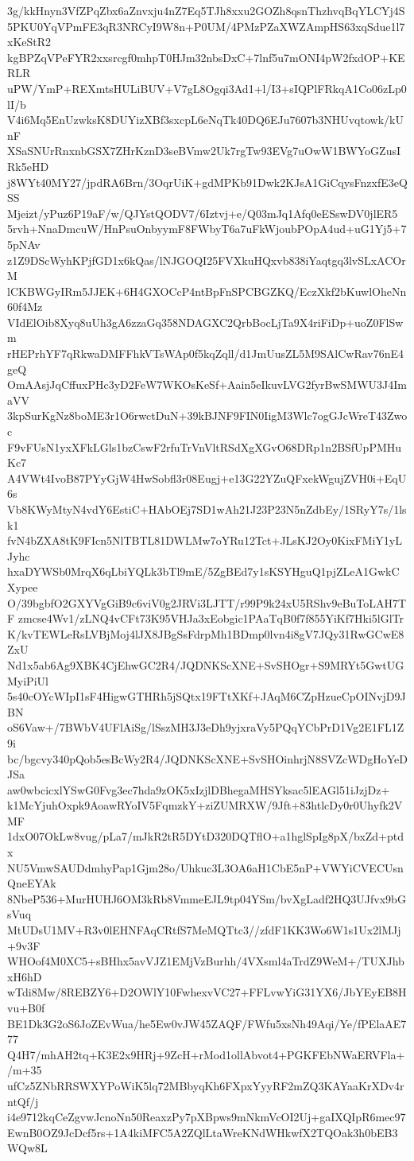 3g/kkHnyn3VfZPqZbx6aZnvxju4nZ7Eq5TJh8xxu2GOZh8qsnThzhvqBqYLCYj4S
5PKU0YqVPmFE3qR3NRCyI9W8n+P0UM/4PMzPZaXWZAmpHS63xqSdue1l7xKeStR2
kgBPZqVPeFYR2xxsrcgf0mhpT0HJm32nbsDxC+7lnf5u7mONI4pW2fxdOP+KERLR
uPW/YmP+REXmtsHULiBUV+V7gL8Ogqi3Ad1+l/I3+sIQPlFRkqA1Co06zLp0lI/b
V4i6Mq5EnUzwksK8DUYizXBf3sxcpL6eNqTk40DQ6EJu7607b3NHUvqtowk/kUnF
XSaSNUrRnxnbGSX7ZHrKznD3seBVmw2Uk7rgTw93EVg7uOwW1BWYoGZusIRk5eHD
j8WYt40MY27/jpdRA6Brn/3OqrUiK+gdMPKb91Dwk2KJsA1GiCqysFnzxfE3eQSS
Mjeizt/yPuz6P19aF/w/QJYstQODV7/6Iztvj+e/Q03mJq1Afq0eESswDV0jlER5
5rvh+NnaDmcuW/HnPsuOnbyymF8FWbyT6a7uFkWjoubPOpA4ud+uG1Yj5+75pNAv
z1Z9DScWyhKPjfGD1x6kQas/lNJGOQI25FVXkuHQxvb838iYaqtgq3lvSLxACOrM
lCKBWGyIRm5JJEK+6H4GXOCcP4ntBpFnSPCBGZKQ/EczXkf2bKuwlOheNn60f4Mz
VIdElOib8Xyq8uUh3gA6zzaGq358NDAGXC2QrbBocLjTa9X4riFiDp+uoZ0FlSwm
rHEPrhYF7qRkwaDMFFhkVTsWAp0f5kqZqll/d1JmUusZL5M9SAlCwRav76nE4geQ
OmAAsjJqCffuxPHc3yD2FeW7WKOsKeSf+Aain5eIkuvLVG2fyrBwSMWU3J4ImaVV
3kpSurKgNz8boME3r1O6rwctDuN+39kBJNF9FIN0IigM3Wlc7ogGJcWreT43Zwoc
F9vFUsN1yxXFkLGls1bzCswF2rfuTrVnVltRSdXgXGvO68DRp1n2BSfUpPMHuKc7
A4VWt4IvoB87PYyGjW4HwSobfl3r08Eugj+e13G22YZuQFxekWgujZVH0i+EqU6s
Vb8KWyMtyN4vdY6EstiC+HAbOEj7SD1wAh21J23P23N5nZdbEy/1SRyY7s/1lsk1
fvN4bZXA8tK9FIcn5NlTBTL81DWLMw7oYRu12Tct+JLsKJ2Oy0KixFMiY1yLJyhc
hxaDYWSb0MrqX6qLbiYQLk3bTl9mE/5ZgBEd7y1sKSYHguQ1pjZLeA1GwkCXypee
O/39bgbfO2GXYVgGiB9c6viV0g2JRVi3LJTT/r99P9k24xU5RShv9eBuToLAH7TF
zmcse4Wv1/zLNQ4vCFt73K95VHJa3xEobgic1PAaTqB0f7f855YiKf7Hki5lGlTr
K/kvTEWLeRsLVBjMoj4lJX8JBgSsFdrpMh1BDmp0lvn4i8gV7JQy31RwGCwE8ZxU
Nd1x5ab6Ag9XBK4CjEhwGC2R4/JQDNKScXNE+SvSHOgr+S9MRYt5GwtUGMyiPiUl
5s40cOYcWIpI1sF4HigwGTHRh5jSQtx19FTtXKf+JAqM6CZpHzueCpOINvjD9JBN
oS6Vaw+/7BWbV4UFlAiSg/lSszMH3J3eDh9yjxraVy5PQqYCbPrD1Vg2E1FL1Z9i
bc/bgcvy340pQob5esBcWy2R4/JQDNKScXNE+SvSHOinhrjN8SVZcWDgHoYeDJSa
aw0wbcicxlYSwG0Fvg3ec7hda9zOK5xIzjlDBhegaMHSYksac5lEAGl51iJzjDz+
k1McYjuhOxpk9AoawRYoIV5FqmzkY+ziZUMRXW/9Jft+83htlcDy0r0Uhyfk2VMF
1dxO07OkLw8vug/pLa7/mJkR2tR5DYtD320DQTflO+a1hglSpIg8pX/bxZd+ptdx
NU5VmwSAUDdmhyPap1Gjm28o/Uhkuc3L3OA6aH1CbE5nP+VWYiCVECUsnQneEYAk
8NbeP536+MurHUHJ6OM3kRb8VmmeEJL9tp04YSm/bvXgLadf2HQ3UJfvx9bGsVuq
MtUDsU1MV+R3v0lEHNFAqCRtfS7MeMQTtc3//zfdF1KK3Wo6W1s1Ux2lMJj+9v3F
WHOof4M0XC5+sBHhx5avVJZ1EMjVzBurhh/4VXsml4aTrdZ9WeM+/TUXJhbxH6hD
wTdi8Mw/8REBZY6+D2OWlY10FwhexvVC27+FFLvwYiG31YX6/JbYEyEB8Hvu+B0f
BE1Dk3G2oS6JoZEvWua/he5Ew0vJW45ZAQF/FWfu5xsNh49Aqi/Ye/fPElaAE777
Q4H7/mhAH2tq+K3E2x9HRj+9ZcH+rMod1ollAbvot4+PGKFEbNWaERVFla+/m+35
ufCz5ZNbRRSWXYPoWiK5lq72MBbyqKh6FXpxYyyRF2mZQ3KAYaaKrXDv4rntQf/j
i4e9712kqCeZgvwJcnoNn50ReaxzPy7pXBpws9mNkmVcOI2Uj+gaIXQIpR6mec97
EwnB0OZ9JcDcf5rs+1A4kiMFC5A2ZQlLtaWreKNdWHkwfX2TQOak3h0bEB3WQw8L
